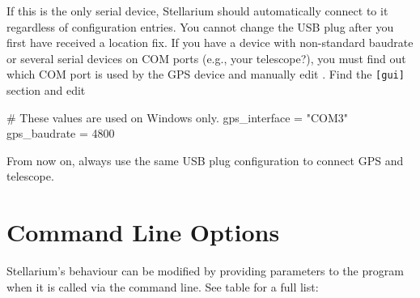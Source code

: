 If this is the only serial device, Stellarium should automatically connect to it regardless of configuration entries. 
You cannot change the USB plug after you first have received a location fix. 
If you have a device with non-standard baudrate or several serial devices on COM ports (e.g., your telescope?), 
you must find out which COM port is used by the GPS device and manually edit . 
Find the \texttt{[gui]} section and edit
\begin{configfile}
[gui]
# These values are used on Windows only.
gps_interface     = "COM3"
gps_baudrate      = 4800
\end{configfile}
From now on, always use the same USB plug configuration to connect GPS and telescope.


\chapter{Command Line Options}
\label{sec:CommandLineOptions}

Stellarium's behaviour can be modified by providing parameters to the
program when it is called via the command line. See table for a full list:

